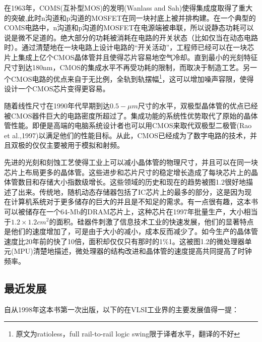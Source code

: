 \documentclass[cn,11pt,chinese]{elegantbook}
\begin{document}
在1963年，COMS(互补型MOS)的发明(Wanlass and Sah)使得集成度取得了重大的突破,此时n沟道和p沟道的MOSFET在同一块衬底上被并排构建。在一个典型的COMS电路中，n沟道和p沟道的MOSFET在电源端被串联，所以说静态功耗可以说是微不足道的。绝大部分的功耗被消耗在电路的开关状态（比如仅当在动态电路时）。通过清楚地在一块电路上设计电路的“开关活动”，工程师已经可以在一块芯片上集成上亿个CMOS晶体管并且使得芯片容易地空气冷却。直到最小的光刻特征尺寸到达180nm，CMOS的集成水平不再受功耗的限制，而取决于制造工艺。另一个CMOS电路的优点来自于无比例，全轨到轨摆幅\footnote{原文为ratioless，full rail-to-rail logic swing限于译者水平，翻译的不好}，这可以增加噪声容限，使得设计一个CMOS芯片变得更容易。


随着线性尺寸在1990年代早期到达$0.5-\mu m$尺寸的水平，双极型晶体管的优点已经被CMOS器件巨大的电路密度所超过了。集成功能的系统性优势取代了原始的晶体管性能。即便是高端的电脑系统设计者也可以用CMOS来取代双极型二极管(Rao et al.,1997)以满足他们的性能目标。从此，CMOS已经成为了数字电路的技术，并且双极的仅仅主要被用于模拟和射频。

先进的光刻和刻蚀工艺使得工业上可以减小晶体管的物理尺寸，并且可以在同一块芯片上布局更多的晶体管。这些进步和芯片尺寸的稳定增长造成了每块芯片上的晶体管数目和存储大小指数级增长。这些领域的历史和现在的趋势被图1.2很好地描述了出来。传统地，随机动态存储器包括了IC芯片上的最多的部分，这是因为现在计算机系统对于更多储存的巨大的并且是不知足的需求。有一点很有趣，这本书可以被储存在一个64-Mb的DRAM芯片上，这种芯片在1997年批量生产，大小相当于$1.2\times 1.2cm^2$的面积。硅器件刺激了信息技术工业的快速发展，他们的显著特点是他们的速度增加了，可是由于大小的减小，成本反而减少了。如今生产的晶体管速度比20年前的快了10倍，面积却仅仅只有那时的1\%1。这被图1.2的微处理器单元(MPU)清楚地描述，微处理器的结构改进和晶体管的速度提高共同提高了时钟频率。

\subsection{最近发展}
自从1998年这本书第一次出版，以下的在VLSI工业界的主要发展值得一提：
\end{document}
